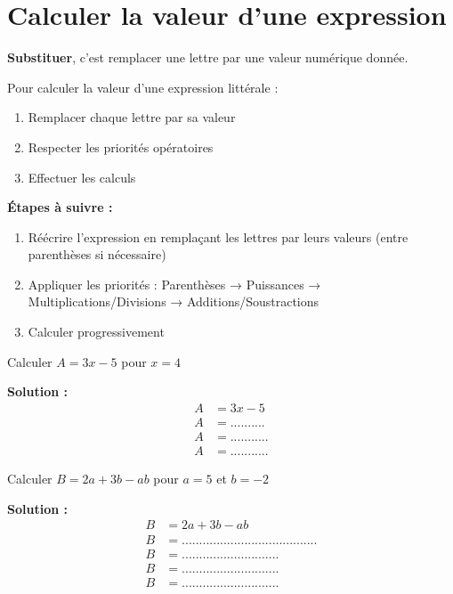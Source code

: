 \section{Calculer la valeur d'une expression}

\begin{definitionbox}[Substitution]
	\textbf{Substituer}, c'est remplacer une lettre par une valeur numérique donnée.
	
	Pour calculer la valeur d'une expression littérale :
	\begin{enumerate}
		\item Remplacer chaque lettre par sa valeur
		\item Respecter les priorités opératoires
		\item Effectuer les calculs
	\end{enumerate}
\end{definitionbox}

\begin{methodebox}
	\textbf{Étapes à suivre :}
	\begin{enumerate}
		\item Réécrire l'expression en remplaçant les lettres par leurs valeurs (entre parenthèses si nécessaire)
		\item Appliquer les priorités : Parenthèses → Puissances → Multiplications/Divisions → Additions/Soustractions
		\item Calculer progressivement
	\end{enumerate}
\end{methodebox}

\begin{examplebox}
	Calculer $A = 3x - 5$ pour $x = 4$
	
	\textbf{Solution :}
	\begin{align*}
		A &= 3x - 5\\
		A &= ..........\\
		A &= ...........\\
		A &= ...........
	\end{align*}
\end{examplebox}

\begin{examplebox}
	Calculer $B = 2a + 3b - ab$ pour $a = 5$ et $b = -2$
	
	\textbf{Solution :}
	\begin{align*}
		B &= 2a + 3b - ab\\
		B &= .......................................\\
		B &= ............................\\
		B &= ............................\\
		B &= ............................
	\end{align*}
\end{examplebox}

